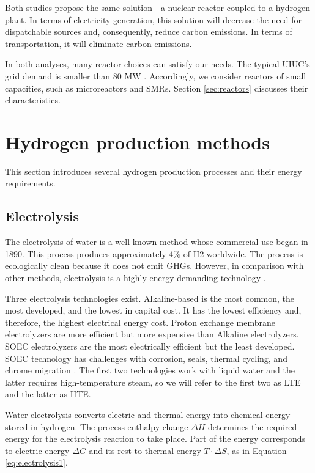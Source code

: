 Both studies propose the same solution - a nuclear reactor coupled to a hydrogen plant.
In terms of electricity generation, this solution will decrease the need for dispatchable sources and, consequently, reduce carbon emissions.
In terms of transportation, it will eliminate carbon emissions.

In both analyses, many reactor choices can satisfy our needs.
The typical \gls{UIUC}'s grid demand is smaller than 80 MW \cite{dotson_optimal_2020}.
Accordingly, we consider reactors of small capacities, such as microreactors and \glspl{SMR}.
Section \ref{sec:reactors} discusses their characteristics.

\section{Hydrogen production methods}
\label{sec:hydro}

This section introduces several hydrogen production processes and their energy requirements.

\subsection{Electrolysis}

The electrolysis of water is a well-known method whose commercial use began in 1890.
This process produces approximately 4\% of \gls{H2} worldwide.
The process is ecologically clean because it does not emit \glspl{GHG}.
However, in comparison with other methods, electrolysis is a highly energy-demanding technology \cite{kalamaras_hydrogen_2013}.

Three electrolysis technologies exist.
Alkaline-based is the most common, the most developed, and the lowest in capital cost.
It has the lowest efficiency and, therefore, the highest electrical energy cost.
Proton exchange membrane electrolyzers are more efficient but more expensive than Alkaline electrolyzers.
\gls{SOEC} electrolyzers are the most electrically efficient but the least developed.
\gls{SOEC} technology has challenges with corrosion, seals, thermal cycling, and chrome migration \cite{kalamaras_hydrogen_2013}.
The first two technologies work with liquid water and the latter requires high-temperature steam, so we will refer to the first two as \gls{LTE} and the latter as \gls{HTE}.

Water electrolysis converts electric and thermal energy into chemical energy stored in hydrogen.
The process enthalpy change $\Delta H$ determines the required energy for the electrolysis reaction to take place.
Part of the energy corresponds to electric energy $\Delta G$ and its rest to thermal energy $T \cdot \Delta S$, as in Equation \ref{eq:electrolysis1}.

